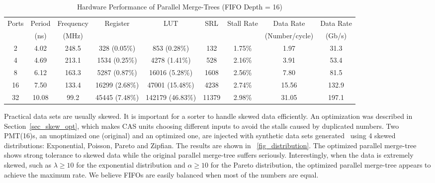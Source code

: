 \documentclass[10pt, conference]{IEEEtran}
\begin{document}
\begin{table}
\caption{Hardware Performance of Parallel Merge-Trees (FIFO Depth = 16)}\label{tab_pmt}
\centering
\begin{tabular}{ccccccccc}
\toprule
Ports     & Period & Frequency 
                             & Register       & LUT              & SRL    & Stall Rate
                                                                                    & Data Rate      & Data Rate\\
          & (ns)    & (MHz)  &                &                  &        &         & (Number/cycle) & (Gb/s)   \\
\midrule
2         & 4.02    & 248.5  & 328 (0.05\%)   & 853 (0.28\%)     & 132    & 1.75\%  & 1.97           & 31.3     \\
4         & 4.69    & 213.1  & 1534 (0.25\%)  & 4278 (1.41\%)    & 528    & 2.16\%  & 3.91           & 53.4     \\
8         & 6.12    & 163.3  & 5287 (0.87\%)  & 16016 (5.28\%)   & 1608   & 2.56\%  & 7.80           & 81.5     \\
16        & 7.50    & 133.4  & 16299 (2.68\%) & 47001 (15.48\%)  & 4238   & 2.74\%  & 15.56          & 132.9    \\
32        & 10.08   &  99.2  & 45445 (7.48\%) & 142179 (46.83\%) & 11379  & 2.98\%  & 31.05          & 197.1    \\
\bottomrule
\end{tabular}
\end{table}

Practical data sets are usually skewed.
It is important for a sorter to handle skewed data efficiently.
An optimization was described in Section~\ref{sec_skew_opt}, which makes CAS units choosing different inputs to avoid the stalls caused by duplicated numbers.
Two PMT(16)s, an unoptimized one (original) and an optimized one, are injected with synthetic data sets generated~\cite{Gray1994} using 4 skewed distributions:
Exponential, Poisson, Pareto and Zipfian.
The results are shown in \figurename~\ref{fig_distribution}.
The optimized parallel merge-tree shows strong tolerance to skewed data while the original parallel merge-tree suffers seriously.
Interestingly, when the data is extremely skewed, such as $\lambda \ge 10$ for the exponential distribution and $\alpha \ge 10$ for the Pareto distribution,
the optimized parallel merge-tree appears to achieve the maximum rate.
We believe FIFOs are easily balanced when most of the numbers are equal.
\end{document}
